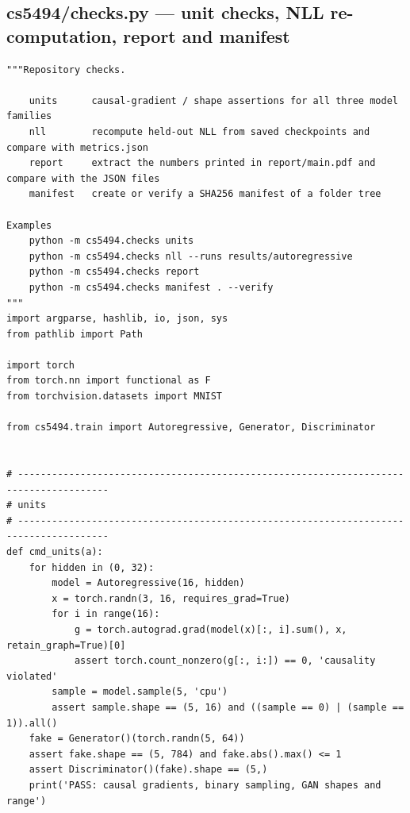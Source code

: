 \subsection*{cs5494/checks.py --- unit checks, NLL re-computation, report and manifest}
\begin{lstlisting}
"""Repository checks.

    units      causal-gradient / shape assertions for all three model families
    nll        recompute held-out NLL from saved checkpoints and compare with metrics.json
    report     extract the numbers printed in report/main.pdf and compare with the JSON files
    manifest   create or verify a SHA256 manifest of a folder tree

Examples
    python -m cs5494.checks units
    python -m cs5494.checks nll --runs results/autoregressive
    python -m cs5494.checks report
    python -m cs5494.checks manifest . --verify
"""
import argparse, hashlib, io, json, sys
from pathlib import Path

import torch
from torch.nn import functional as F
from torchvision.datasets import MNIST

from cs5494.train import Autoregressive, Generator, Discriminator


# --------------------------------------------------------------------------------------
# units
# --------------------------------------------------------------------------------------
def cmd_units(a):
    for hidden in (0, 32):
        model = Autoregressive(16, hidden)
        x = torch.randn(3, 16, requires_grad=True)
        for i in range(16):
            g = torch.autograd.grad(model(x)[:, i].sum(), x, retain_graph=True)[0]
            assert torch.count_nonzero(g[:, i:]) == 0, 'causality violated'
        sample = model.sample(5, 'cpu')
        assert sample.shape == (5, 16) and ((sample == 0) | (sample == 1)).all()
    fake = Generator()(torch.randn(5, 64))
    assert fake.shape == (5, 784) and fake.abs().max() <= 1
    assert Discriminator()(fake).shape == (5,)
    print('PASS: causal gradients, binary sampling, GAN shapes and range')



\end{lstlisting}
